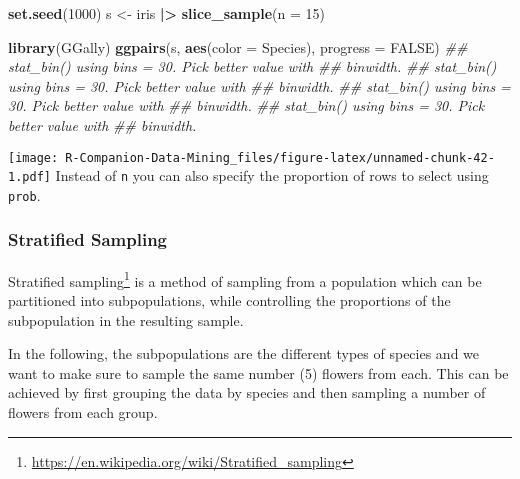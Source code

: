 \documentclass[
  notitlepage]{book}
\newenvironment{Shaded}{\begin{snugshade}}{\end{snugshade}}
\newcommand{\CommentTok}[1]{\textcolor[rgb]{0.56,0.35,0.01}{\textit{#1}}}
\newcommand{\DataTypeTok}[1]{\textcolor[rgb]{0.13,0.29,0.53}{#1}}
\newcommand{\DecValTok}[1]{\textcolor[rgb]{0.00,0.00,0.81}{#1}}
\newcommand{\ErrorTok}[1]{\textcolor[rgb]{0.64,0.00,0.00}{\textbf{#1}}}
\newcommand{\KeywordTok}[1]{\textcolor[rgb]{0.13,0.29,0.53}{\textbf{#1}}}
\newcommand{\NormalTok}[1]{#1}
\newcommand{\OperatorTok}[1]{\textcolor[rgb]{0.81,0.36,0.00}{\textbf{#1}}}
\newcommand{\OtherTok}[1]{\textcolor[rgb]{0.56,0.35,0.01}{#1}}
\newcommand{\StringTok}[1]{\textcolor[rgb]{0.31,0.60,0.02}{#1}}
\DeclareRobustCommand{\href}[2]{#2\footnote{\url{#1}}}
\begin{document}
\begin{Shaded}
\begin{Highlighting}[]
\KeywordTok{set.seed}\NormalTok{(}\DecValTok{1000}\NormalTok{)}
\NormalTok{s \textless{}{-}}\StringTok{ }\NormalTok{iris }\OperatorTok{|}\ErrorTok{\textgreater{}}\StringTok{ }
\StringTok{  }\KeywordTok{slice\_sample}\NormalTok{(}\DataTypeTok{n =} \DecValTok{15}\NormalTok{)}

\KeywordTok{library}\NormalTok{(GGally)}
\KeywordTok{ggpairs}\NormalTok{(s, }\KeywordTok{aes}\NormalTok{(}\DataTypeTok{color =}\NormalTok{ Species), }\DataTypeTok{progress =} \OtherTok{FALSE}\NormalTok{)}
\CommentTok{\#\# \textasciigrave{}stat\_bin()\textasciigrave{} using \textasciigrave{}bins = 30\textasciigrave{}. Pick better value with}
\CommentTok{\#\# \textasciigrave{}binwidth\textasciigrave{}.}
\CommentTok{\#\# \textasciigrave{}stat\_bin()\textasciigrave{} using \textasciigrave{}bins = 30\textasciigrave{}. Pick better value with}
\CommentTok{\#\# \textasciigrave{}binwidth\textasciigrave{}.}
\CommentTok{\#\# \textasciigrave{}stat\_bin()\textasciigrave{} using \textasciigrave{}bins = 30\textasciigrave{}. Pick better value with}
\CommentTok{\#\# \textasciigrave{}binwidth\textasciigrave{}.}
\CommentTok{\#\# \textasciigrave{}stat\_bin()\textasciigrave{} using \textasciigrave{}bins = 30\textasciigrave{}. Pick better value with}
\CommentTok{\#\# \textasciigrave{}binwidth\textasciigrave{}.}
\end{Highlighting}
\end{Shaded}

\texttt{[image: R-Companion-Data-Mining\_files/figure-latex/unnamed-chunk-42-1.pdf]}
Instead of \texttt{n} you can also specify the proportion of rows to select using
\texttt{prob}.

\hypertarget{stratified-sampling}{%
\subsubsection{Stratified Sampling}\label{stratified-sampling}}

\href{https://en.wikipedia.org/wiki/Stratified_sampling}{Stratified sampling}
is a method of sampling from a population which can be partitioned into
subpopulations, while controlling the proportions of the subpopulation
in the resulting sample.

In the following, the subpopulations are the different types of species
and we want to make sure to sample the same number (5) flowers from
each. This can be achieved by first grouping the data by species and
then sampling a number of flowers from each group.
\end{document}
